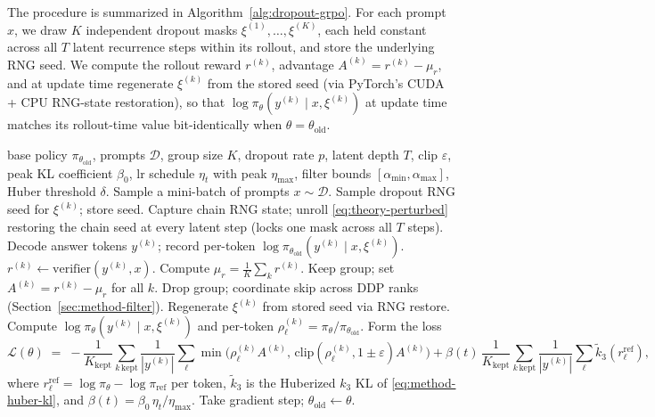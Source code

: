 \documentclass[11pt]{article}
\theoremstyle{definition}
\theoremstyle{remark}
\newcommand{\D}{\mathcal{D}}
\newcommand{\Loss}{\mathcal{L}}
\newcommand{\eps}{\varepsilon}
\newcommand{\old}{\mathrm{old}}
\begin{document}
The procedure is summarized in Algorithm~\ref{alg:dropout-grpo}.  For
each prompt $x$, we draw $K$ independent dropout masks
$\xi^{(1)}, \dots, \xi^{(K)}$, each held constant across all $T$ latent
recurrence steps within its rollout, and store the underlying RNG
seed.  We compute the rollout reward $r^{(k)}$, advantage
$A^{(k)} = r^{(k)} - \mu_r$, and at update time regenerate
$\xi^{(k)}$ from the stored seed (via PyTorch's CUDA + CPU RNG-state
restoration), so that $\log \pi_\theta(y^{(k)} \mid x, \xi^{(k)})$ at
update time matches its rollout-time value bit-identically when
$\theta = \theta_\old$.

\begin{algorithm}[h]
\caption{Dropout-GRPO for latent-reasoning LLMs}
\label{alg:dropout-grpo}
\begin{algorithmic}[1]
\Require base policy $\pi_{\theta_\old}$, prompts $\D$, group size $K$,
         dropout rate $p$, latent depth $T$, clip $\eps$, peak KL
         coefficient $\beta_0$, lr schedule $\eta_t$ with peak
         $\eta_{\max}$, filter bounds
         $[\alpha_{\min}, \alpha_{\max}]$, Huber threshold $\delta$.
  \State Sample a mini-batch of prompts $x \sim \D$.
    \State Sample dropout RNG seed for $\xi^{(k)}$; store seed.
    \State Capture chain RNG state; unroll
           \eqref{eq:theory-perturbed} restoring the chain seed at
           every latent step (locks one mask across all $T$ steps).
    \State Decode answer tokens $y^{(k)}$; record per-token
           $\log \pi_{\theta_\old}(y^{(k)} \mid x, \xi^{(k)})$.
    \State $r^{(k)} \gets \mathrm{verifier}(y^{(k)}, x)$.
  \EndFor
  \State Compute $\mu_r = \tfrac{1}{K}\sum_k r^{(k)}$.
    \State Keep group; set $A^{(k)} = r^{(k)} - \mu_r$ for all $k$.
  \Else
    \State Drop group; coordinate skip across DDP ranks
           (Section~\ref{sec:method-filter}).
  \EndIf
    \State Regenerate $\xi^{(k)}$ from stored seed via RNG restore.
    \State Compute $\log \pi_\theta(y^{(k)} \mid x, \xi^{(k)})$ and
           per-token $\rho_\ell^{(k)} = \pi_\theta / \pi_{\theta_\old}$.
  \EndFor
  \State Form the loss
         \begin{equation*}
         \Loss(\theta)
           \;=\;
         -\frac{1}{K_{\mathrm{kept}}}
            \sum_{k\,\mathrm{kept}} \frac{1}{|y^{(k)}|}
            \sum_\ell
              \min\!\big(\rho_\ell^{(k)} A^{(k)},\,
                 \mathrm{clip}(\rho_\ell^{(k)}, 1\pm\eps) A^{(k)}\big)
           + \beta(t)\,\frac{1}{K_{\mathrm{kept}}}
             \sum_{k\,\mathrm{kept}}
             \frac{1}{|y^{(k)}|}\sum_\ell \tilde k_3(r_\ell^{\mathrm{ref}}),
         \end{equation*}
         where $r_\ell^{\mathrm{ref}} = \log \pi_\theta - \log \pi_{\mathrm{ref}}$
         per token, $\tilde k_3$ is the Huberized $k_3$ KL of
         \eqref{eq:method-huber-kl}, and
         $\beta(t) = \beta_0\,\eta_t / \eta_{\max}$.
  \State Take gradient step; $\theta_\old \gets \theta$.
\EndFor
\end{algorithmic}
\end{algorithm}
\end{document}
